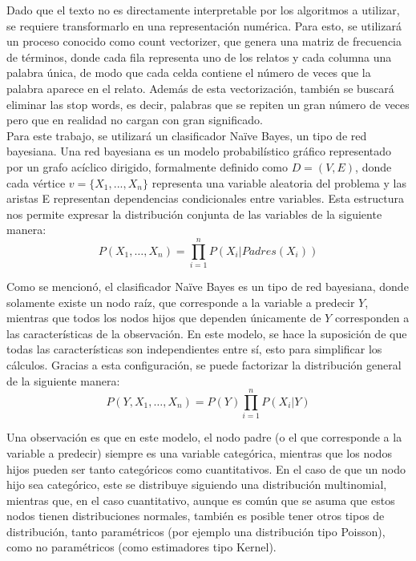 \documentclass[12pt, letterpaper]{report}
\begin{document}
Dado que el texto no es directamente interpretable por los algoritmos a utilizar, se requiere transformarlo en una representación numérica. Para esto, se utilizará un proceso conocido como count vectorizer, que genera una matriz de frecuencia de términos, donde cada fila representa uno de los relatos y cada columna una palabra única, de modo que cada celda contiene el número de veces que la palabra aparece en el relato. Además de esta vectorización, también se buscará eliminar las stop words, es decir, palabras que se repiten un gran número de veces pero que en realidad no cargan con gran significado. \cite{ibm2023}
\\

Para este trabajo, se utilizará un clasificador Naïve Bayes, un tipo de red bayesiana. Una red bayesiana es un modelo probabilístico gráfico representado por un grafo acíclico dirigido, formalmente definido como $D=(V, E)$, donde cada vértice $v=\{ X_1, ..., X_n\}$ representa una variable aleatoria del problema y las aristas E representan dependencias condicionales entre variables. Esta estructura nos permite expresar la distribución conjunta de las variables de la siguiente manera:\cite{bhattarai2025}
\begin{equation*}
    P(X_1,\ldots ,X_n)=\prod_{i=1}^n P(X_i|Padres(X_i))
\end{equation*}

Como se mencionó, el clasificador Naïve Bayes es un tipo de red bayesiana, donde solamente existe un nodo raíz, que corresponde a la variable a predecir $Y$, mientras que todos los nodos hijos que dependen únicamente de $Y$ corresponden a las características de la observación. En este modelo, se hace la suposición de que todas las características son independientes entre sí, esto para simplificar los cálculos. Gracias a esta configuración, se puede factorizar la distribución general de la siguiente manera:
\begin{equation*}
    P(Y,X_1,\ldots ,X_n)=P(Y)\prod_{i=1}^n P(X_i|Y)
\end{equation*}

Una observación es que en este modelo, el nodo padre (o el que corresponde a la variable a predecir) siempre es una variable categórica, mientras que los nodos hijos pueden ser tanto categóricos como cuantitativos. En el caso de que un nodo hijo sea categórico, este se distribuye siguiendo una distribución multinomial, mientras que, en el caso cuantitativo, aunque es común que se asuma que estos nodos tienen distribuciones normales, también es posible tener otros tipos de distribución, tanto paramétricos (por ejemplo una distribución tipo Poisson), como no paramétricos (como estimadores tipo Kernel).
\\
\end{document}
